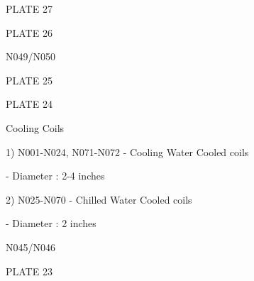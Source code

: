 \documentclass[a4paper,portrait,12pt]{article}
\begin{document}
\begin{flushleft}
PLATE 27
\end{flushleft}





\begin{flushleft}
PLATE 26
\end{flushleft}





\begin{flushleft}
N049/N050
\end{flushleft}





\begin{flushleft}
PLATE 25
\end{flushleft}





\begin{flushleft}
PLATE 24
\end{flushleft}





\begin{flushleft}
Cooling Coils
\end{flushleft}


\begin{flushleft}
1) N001-N024, N071-N072 - Cooling Water Cooled coils
\end{flushleft}


\begin{flushleft}
- Diameter : 2-4 inches
\end{flushleft}


\begin{flushleft}
2) N025-N070 - Chilled Water Cooled coils
\end{flushleft}


\begin{flushleft}
- Diameter : 2 inches
\end{flushleft}





\begin{flushleft}
N045/N046
\end{flushleft}





\begin{flushleft}
PLATE 23
\end{flushleft}
\end{document}
